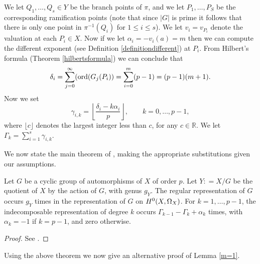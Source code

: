 We let $Q_1, \ldots, Q_s \in Y$ be the branch points of $\pi$, and we let $P_1, \ldots, P_S$ be the corresponding ramification points (note that since $|G|$ is prime it follows that there is only one point in $\pi^{-1}(Q_i)$ for $1 \leq i \leq s$).
We let $v_i = v_{P_i}$ denote the valuation at each $P_i \in X$.
Now if we let $\alpha_i = -v_i(a) = m$ then we can compute the different exponent (see Definition \ref{definitiondifferent}) at $P_i$.
From Hilbert's formula (Theorem \ref{hilbertsformula}) we can conclude that
    \[
    \delta_i = \sum_{j=0}^\infty (\operatorname{ord}(G_j(P_i)) = \sum_{i=0}^{m}(p-1) = (p-1)(m+1).
    \]
Now we set
    \[
    \gamma_{i,k} = \left\lfloor \frac{\delta_i - k \alpha_i}{p} \right\rfloor, \qquad k = 0, \ldots, p-1,
    \]
where $\lfloor c \rfloor$ denotes the largest integer less than $c$, for any $c \in \mathbb R$.
We let $\Gamma_k = \sum_{i=1}^s \gamma_{i,k}$.

We now state the main theorem of \cite{valmadan}, making the appropriate substitutions given our assumptions.

    \begin{thm}
    Let $G$ be a cyclic group of automorphisms of $X$ of order $p$.
    Let $Y : = X/G$ be the quotient of $X$ by the action of $G$, with genus $g_Y$.
    The regular representation of $G$ occurs $g_Y$ times in the representation of $G$ on ${H^0(X,\Omega_X)}$.
    For $k=1, \ldots, p-1$, the indecomposable representation of degree $k$ occurs $\Gamma_{k-1} - \Gamma_k + \alpha_k$ times, with $\alpha_k = -1$ if $k = p-1$, and zero otherwise.
    \end{thm}
    \begin{proof}
    See \cite[Thm.\ 1]{valmadan}.
    \end{proof}

Using the above theorem we now give an alternative proof of Lemma \ref{m=1}.

